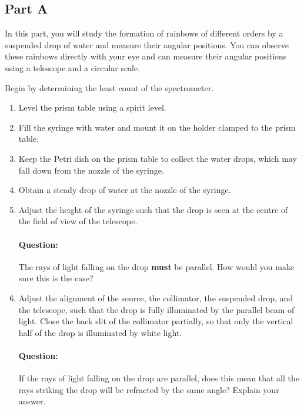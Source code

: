 \begin{refsection}
\subsection*{Part A}

In this part, you will study the formation of rainbows of different orders by a suspended drop of water and measure their angular positions. You can observe these rainbows directly with your eye and can measure their angular positions using a telescope and a circular scale. 

\begin{imp}
Begin by determining the least count of the spectrometer.
\end{imp}

\begin{enumerate}
    \item Level the prism table using a spirit level. 
    
    \item Fill the syringe with water and mount it on the holder clamped to the prism table.
    
    \item Keep the Petri dish on the prism table to collect the water drops, which may fall down from the nozzle of the syringe. 
    
    \item Obtain a steady drop of water at the nozzle of the syringe. 
    
    \item Adjust the height of the syringe such that the drop is seen at the centre of the field of view of the telescope.
    
    \begin{question}
    \paragraph{Question:} The rays of light falling on the drop \textbf{must} be parallel. How would you make sure this is the case?
    \end{question}
    
    \item Adjust the alignment of the source, the collimator, the suspended drop, and the telescope, such that the drop is fully illuminated by the parallel beam of light. Close the back slit of the collimator partially, so that only the vertical half of the drop is illuminated by white light.

    \begin{question}
    \paragraph{Question:} If the rays of light falling on the drop are parallel, does this mean that all the rays striking the drop will be refracted by the same angle? Explain your answer.
    \end{question}
    

\end{enumerate}
\end{refsection}
